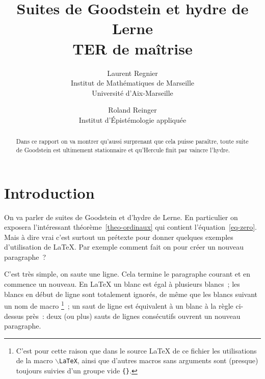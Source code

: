 \documentclass{article}
\author{
  Laurent Regnier\\
  Institut de Mathématiques de Marseille\\
  Université d'Aix-Marseille
  \and
  Roland Reinger\\
  Institut d'Épistémologie appliquée
}
\title{Suites de Goodstein et hydre de Lerne\\
       \small TER de maîtrise}
\begin{document}
\maketitle

\begin{abstract}
  Dans ce rapport on va montrer qu'aussi surprenant que cela puisse paraître,
  toute suite de Goodstein est ultimement stationnaire et qu'Hercule finit par
  vaincre l'hydre.
\end{abstract}

\tableofcontents

\section{Introduction}
On va parler de suites de Goodstein et d'hydre de Lerne. En particulier on
exposera l'intéressant théorème~\ref{theo-ordinaux} %
qui contient l'équation~\ref{eq-zero}.  Mais à dire vrai c'est surtout un
prétexte pour donner quelques exemples d'utilisation de \LaTeX. Par exemple
comment fait on pour créer un nouveau paragraphe~?

C'est très simple, on saute une ligne. Cela termine le paragraphe courant et
en commence un nouveau. En \LaTeX{} un blanc est égal à    plusieurs   blancs~;
les blancs en début de ligne sont totalement ignorés, de même que les blancs
suivant un nom de macro%
\footnote{C'est pour cette raison que dans le source \LaTeX{} de ce
  fichier les utilisations de la macro \texttt{$\backslash$LaTeX},
  ainsi que d'autres macros sans arguments sont (presque) toujours
  suivies d'un groupe vide \texttt{\{\}}.%
}~;
un saut de ligne est équivalent à un blanc à la règle ci-dessus près~: deux (ou
plus) sauts de lignes consécutifs ouvrent un nouveau paragraphe.
\end{document}
